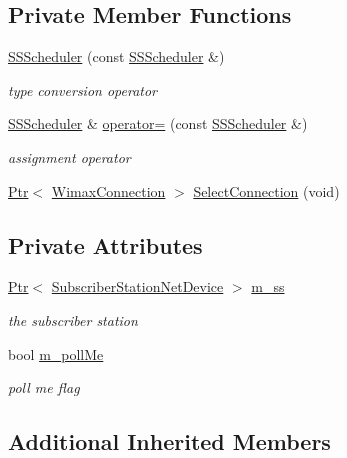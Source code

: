 \subsection*{Private Member Functions}
\begin{DoxyCompactItemize}
\item 
\hyperlink{classns3_1_1SSScheduler_a9ecfd9e0010b10960ddb1aa5a4f0c397}{S\+S\+Scheduler} (const \hyperlink{classns3_1_1SSScheduler}{S\+S\+Scheduler} \&)
\begin{DoxyCompactList}\small\item\em type conversion operator \end{DoxyCompactList}\item 
\hyperlink{classns3_1_1SSScheduler}{S\+S\+Scheduler} \& \hyperlink{classns3_1_1SSScheduler_a63593068b04c631a1c6d594a1784f70e}{operator=} (const \hyperlink{classns3_1_1SSScheduler}{S\+S\+Scheduler} \&)
\begin{DoxyCompactList}\small\item\em assignment operator \end{DoxyCompactList}\item 
\hyperlink{classns3_1_1Ptr}{Ptr}$<$ \hyperlink{classns3_1_1WimaxConnection}{Wimax\+Connection} $>$ \hyperlink{classns3_1_1SSScheduler_ac66b795f13ed11290d5401e98a8746ea}{Select\+Connection} (void)
\end{DoxyCompactItemize}
\subsection*{Private Attributes}
\begin{DoxyCompactItemize}
\item 
\hyperlink{classns3_1_1Ptr}{Ptr}$<$ \hyperlink{classns3_1_1SubscriberStationNetDevice}{Subscriber\+Station\+Net\+Device} $>$ \hyperlink{classns3_1_1SSScheduler_a9a0b3cae20f18593e3d150e7534ce678}{m\+\_\+ss}
\begin{DoxyCompactList}\small\item\em the subscriber station \end{DoxyCompactList}\item 
bool \hyperlink{classns3_1_1SSScheduler_a2e2bc18b11bd58e62fd69cca83994ea0}{m\+\_\+poll\+Me}
\begin{DoxyCompactList}\small\item\em poll me flag \end{DoxyCompactList}\end{DoxyCompactItemize}
\subsection*{Additional Inherited Members}


